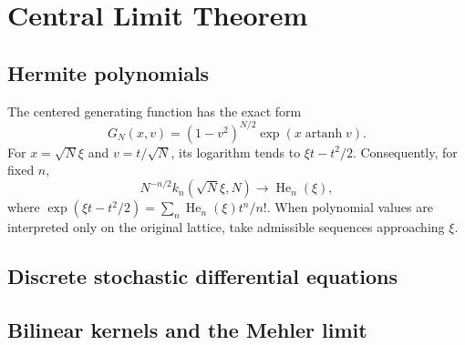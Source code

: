 \chapter{Central Limit Theorem}
\label{ch:11}
\section{Hermite polynomials}
\label{sec:11-1}
The centered generating function has the exact form
\[
G_N(x,v)=(1-v^2)^{N/2}\exp(x\operatorname{artanh}v).
\]
For $x=\sqrt N\xi$ and $v=t/\sqrt N$, its logarithm tends to $\xi t-t^2/2$. Consequently, for fixed $n$,
\[
N^{-n/2}k_n(\sqrt N\xi,N)\longrightarrow\operatorname{He}_n(\xi),
\]
where $\exp(\xi t-t^2/2)=\sum_n\operatorname{He}_n(\xi)t^n/n!$. When polynomial values are interpreted only on the original lattice, take admissible sequences approaching $\xi$.

\section{Discrete stochastic differential equations}
\label{sec:11-2}

\section{Bilinear kernels and the Mehler limit}
\label{sec:11-3}

